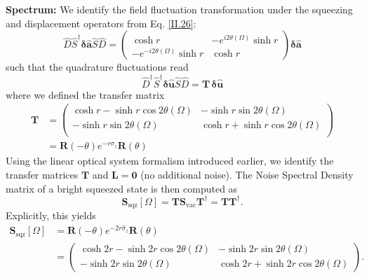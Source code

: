 \noindent \textbf{Spectrum: }
We identify the field fluctuation transformation under the squeezing and displacement operators from Eq. \ref{II.26}:
\begin{equation}
\hat D \hat{S}^\dagger \mathbf{\delta \hat{a}} \hat{S} \hat D = \begin{pmatrix}
\cosh r & -e^{i 2\theta(\Omega)} \sinh r \\
-e^{-i 2\theta(\Omega)} \sinh r & \cosh r
\end{pmatrix}
 \mathbf{\delta \hat{a}} 
\end{equation}
such that the quadrature fluctuations read 
\begin{equation}
\hat{D}^\dagger \hat S^\dagger \mathbf{\delta \hat{u}} \hat S \hat D
=  \mathbf{T} \, \mathbf{\delta \hat{u}} 
\end{equation}
where we defined the transfer matrix
\begin{equation*}
\begin{split}
\mathbf{T} & =\begin{pmatrix}
\cosh r - \sinh r \cos 2\theta(\Omega) & -  \sinh r \sin 2\theta(\Omega) \\[6pt]
-  \sinh r \sin 2\theta(\Omega) & \cosh r + \sinh r \cos 2\theta(\Omega) \\
\end{pmatrix} \\
& = \mathbf{R}(-\theta) e^{-r \sigma_z} \mathbf{R}(\theta)
\end{split}
\end{equation*}
Using the linear optical system formalism introduced earlier, we identify the transfer matrices $\mathbf{T}$ and $\mathbf{L} = \mathbf{0}$ (no additional noise). The Noise Spectral Density matrix of a bright squeezed state is then computed as
\begin{equation}
  \mathbf S_{\text{sqz}}[\Omega] = \mathbf{T}\mathbf{S}_{\text{vac}} \mathbf{T}^{\dagger} = \mathbf{T}\mathbf{T}^{\dagger}.
\end{equation}
Explicitly, this yields
\begin{equation}
  \begin{split}
\mathbf{S}_{\text{sqz}}[\Omega] &  = \mathbf{R}(-\theta) e^{-2r \hat \sigma_z} \mathbf{R}(\theta)\\
& = \begin{pmatrix}
\cosh 2r - \sinh 2r \cos 2\theta(\Omega) & -\sinh 2r \sin 2 \theta(\Omega) \\[6pt]
-\sinh 2r \sin 2\theta(\Omega) & \cosh 2r + \sinh 2r \cos 2\theta(\Omega)
\end{pmatrix}. 
\label{II.xx4}
  \end{split}
\end{equation}
